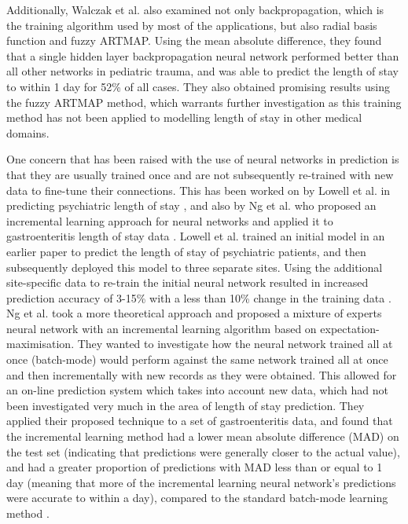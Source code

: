 Additionally, Walczak et al. also examined not only backpropagation, which
is the training algorithm used by most of the applications, but also radial
basis function and fuzzy ARTMAP. Using the mean absolute difference, they
found that a single hidden layer backpropagation neural network performed
better than all other networks in pediatric trauma, and was able to predict
the length of stay to within 1 day for 52\% of all cases. They also obtained
promising results using the fuzzy ARTMAP method, which warrants further
investigation as this training method has not been applied to modelling
length of stay in other medical domains.

One concern that has been raised with the use of neural networks in prediction
is that they are usually trained once and are not subsequently re-trained with
new data to fine-tune their connections. This has been worked on by Lowell et
al. in predicting psychiatric length of stay \citep{Lowell1997}, and also by
Ng et al. who proposed an incremental learning approach for neural networks
and applied it to gastroenteritis length of stay data \citep{Ng2006}. Lowell et
al. trained an initial model in an earlier paper to predict the length of stay
of psychiatric patients, and then subsequently deployed this model to three
separate sites. Using the additional site-specific data to re-train the initial
neural network resulted in increased prediction accuracy of 3-15\% with a less
than 10\% change in the training data \citep{Lowell1997}. Ng et al. took a more
theoretical approach and proposed a mixture of experts neural network with an
incremental learning algorithm based on expectation-maximisation. They wanted
to investigate how the neural network trained all at once (batch-mode)
would perform against the same network trained all at once and then
incrementally with new records as they were obtained. This allowed for an
on-line prediction system which takes into account new data, which had not
been investigated very much in the area of length of stay prediction. They
applied their proposed technique to a set of gastroenteritis data, and found
that the incremental learning method had a lower mean absolute difference (MAD)
on the test set (indicating that predictions were generally closer to the
actual value), and had a greater proportion of predictions with MAD less than
or equal to 1 day (meaning that more of the incremental learning neural
network's predictions were accurate to within a day), compared to the standard
batch-mode learning method \citep{Ng2006}.

